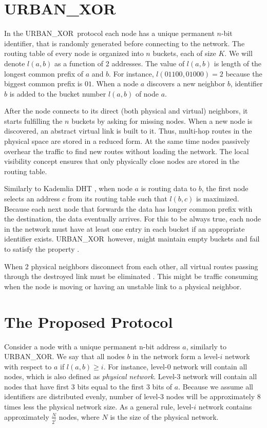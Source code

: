 \documentclass[14pt]{extarticle}
\theoremstyle{definition}
\newcommand{\urbanxor}{URBAN\_XOR}
\begin{document}
\section{\urbanxor}

In the \urbanxor\ protocol each node has a unique permanent $n$-bit identifier, that is randomly generated before connecting to the network. The routing table of every node is organized into $n$ buckets, each of size $K$. We will denote $l(a,b)$ as a function of 2 addresses. The value of $l(a,b)$ is length of the longest common prefix of $a$ and $b$. For instance, $l(01100, 01000) = 2$ because the biggest common prefix is $01$. When a node $a$ discovers a new neighbor $b$, identifier $b$ is added to the bucket number $l(a,b)$ of node $a$.

After the node connects to its direct (both physical and virtual) neighbors, it starts fulfilling the $n$ buckets by asking for missing nodes. When a new node is discovered, an abstract virtual link is built to it. Thus, multi-hop routes in the physical space are stored in a reduced form. At the same time nodes passively overhear the traffic to find new routes without loading the network. The local visibility concept ensures that only physically close nodes are stored in the routing table.

Similarly to Kademlia DHT \cite{kademlia}, when node $a$ is routing data to $b$, the first node selects an address $c$ from its routing table such that $l(b,c)$ is maximized. Because each next node that forwards the data has longer common prefix with the destination, the data eventually arrives. For this to be always true, each node in the network must have at least one entry in each bucket if an appropriate identifier exists. \urbanxor\, however, might maintain empty buckets and fail to satisfy the property \cite{Pasquini}.

When 2 physical neighbors disconnect from each other, all virtual routes passing through the destroyed link must be eliminated \cite{Pasquini}. This might be traffic consuming when the node is moving or having an unstable link to a physical neighbor.


\section{The Proposed Protocol}

Consider a node with a unique permanent n-bit address $a$, similarly to \urbanxor. We say that all nodes $b$ in the network form a level-$i$ network with respect to $a$ if $l(a,b) \ge i$. For instance, level-0 network will contain all nodes, which is also defined as \emph{physical network}. Level-3 network will contain all nodes that have first 3 bits equal to the first 3 bits of $a$. Because we assume all identifiers are distributed evenly, number of level-3 nodes will be approximately 8 times less the physical network size. As a general rule, level-$i$ network contains approximately $\frac{N}{2^i}$ nodes, where $N$ is the size of the physical network.
\end{document}
